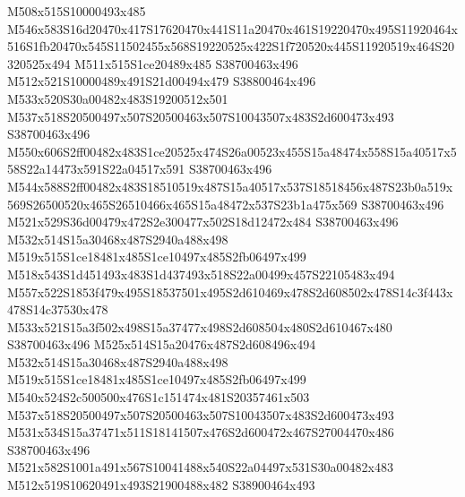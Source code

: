 \documentclass{article}
\begin{document}
\begin{multicols}{2}






M508x515S10000493x485 M546x583S16d20470x417S17620470x441S11a20470x461S19220470x495S11920464x516S1fb20470x545S11502455x568S19220525x422S1f720520x445S11920519x464S20320525x494 M511x515S1ce20489x485 S38700463x496 M512x521S10000489x491S21d00494x479 S38800464x496 M533x520S30a00482x483S19200512x501 M537x518S20500497x507S20500463x507S10043507x483S2d600473x493 S38700463x496 M550x606S2ff00482x483S1ce20525x474S26a00523x455S15a48474x558S15a40517x558S22a14473x591S22a04517x591 S38700463x496 M544x588S2ff00482x483S18510519x487S15a40517x537S18518456x487S23b0a519x569S26500520x465S26510466x465S15a48472x537S23b1a475x569 S38700463x496 M521x529S36d00479x472S2e300477x502S18d12472x484 S38700463x496 M532x514S15a30468x487S2940a488x498 M519x515S1ce18481x485S1ce10497x485S2fb06497x499 M518x543S1d451493x483S1d437493x518S22a00499x457S22105483x494 M557x522S1853f479x495S18537501x495S2d610469x478S2d608502x478S14c3f443x478S14c37530x478 M533x521S15a3f502x498S15a37477x498S2d608504x480S2d610467x480 S38700463x496 M525x514S15a20476x487S2d608496x494 M532x514S15a30468x487S2940a488x498 M519x515S1ce18481x485S1ce10497x485S2fb06497x499 M540x524S2c500500x476S1c151474x481S20357461x503 M537x518S20500497x507S20500463x507S10043507x483S2d600473x493 M531x534S15a37471x511S18141507x476S2d600472x467S27004470x486 S38700463x496 M521x582S1001a491x567S10041488x540S22a04497x531S30a00482x483 M512x519S10620491x493S21900488x482 S38900464x493


\end{multicols}
\end{document}
